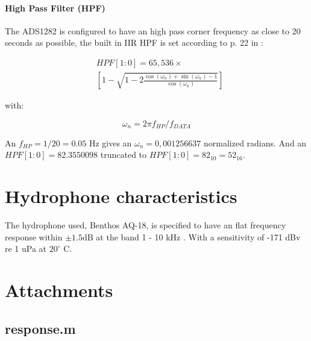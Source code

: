 \documentclass[a4paper]{article}
\begin{document}
\begin{multicols}{2}
\paragraph{High Pass Filter (HPF)} The ADS1282 is configured to have an high
pass corner frequency as close to 20 seconds as possible, the built in
IIR HPF is set according to p. 22 in :

\begin{equation}
  \begin{aligned}
    & HPF[1:0] = 65,536 \times \\
    & \left[ 1 - \sqrt{1 - 2 \frac{\cos (\omega_n) +
    \sin (\omega_n) - 1}{\cos
    (\omega_n)}}\right]
  \end{aligned}
  \label{eqn:hpf}
\end{equation}

with:

\begin{equation}
  \omega_n = 2 \pi f_{HP} / f_{DATA}
  \label{eqn:nat_freq}
\end{equation}

An $f_{HP} = 1/20 = 0.05 $ Hz gives an $\omega_n = 0,001256637$ normalized
radians. And an $HPF[1:0] = 82.3550098$ truncated to $HPF[1:0] = 82_{10} =
52_{16}$.

\section{Hydrophone characteristics}
The hydrophone used, Benthos AQ-18, is specified to have an flat frequency response within
$\pm 1.5 \text{dB}$ at the band 1 - 10 kHz
\cite{benthos_hydrophone_brochure}. With a sensitivity of -171 dBv re 1
uPa at $20^\circ$ C.

\vspace{5em}
\printbibliography
\end{multicols}

\newpage

\section{Attachments}
\subsection{response.m}

\end{document}
